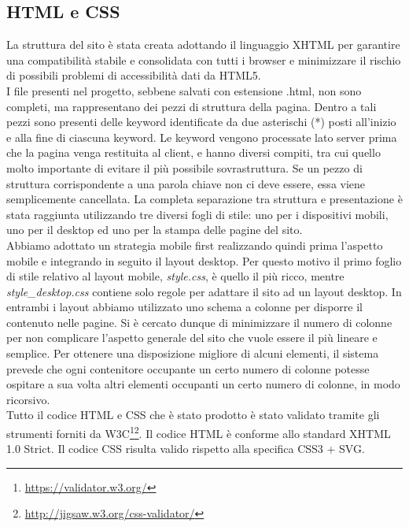 \subsection{HTML e CSS}
La struttura del sito è stata creata adottando il linguaggio XHTML per garantire una compatibilità stabile e consolidata con tutti i browser e minimizzare il rischio di possibili problemi di accessibilità dati da HTML5.\\
I file presenti nel progetto, sebbene salvati con estensione .html, non sono completi, ma rappresentano dei pezzi di struttura della pagina. Dentro a tali pezzi sono presenti delle keyword identificate da due asterischi (*) posti all'inizio e alla fine di ciascuna keyword. Le keyword vengono processate lato server prima che la pagina venga restituita al client, e hanno diversi compiti, tra cui quello molto importante di evitare il più possibile sovrastruttura. Se un pezzo di struttura corrispondente a una parola chiave non ci deve essere, essa viene semplicemente cancellata.
La completa separazione tra struttura e presentazione è stata raggiunta utilizzando tre diversi fogli di stile: uno per i dispositivi mobili, uno per il desktop ed uno per la stampa delle pagine del sito.\\
 Abbiamo adottato un strategia mobile first realizzando quindi prima l'aspetto mobile e integrando in seguito il layout desktop. Per questo motivo il primo foglio di stile relativo al layout mobile, \textit{style.css}, è quello il più ricco, mentre \textit{style\_desktop.css} contiene solo regole per adattare il sito ad un layout desktop. In entrambi i layout abbiamo utilizzato uno schema a colonne per disporre il contenuto nelle pagine. Si è cercato dunque di minimizzare il numero di colonne per non complicare l'aspetto generale del sito che vuole essere il più lineare e semplice. Per ottenere una disposizione migliore di alcuni elementi, il sistema prevede che ogni contenitore occupante un certo numero di colonne potesse ospitare a sua volta altri elementi occupanti un certo numero di colonne, in modo ricorsivo.
\\
Tutto il codice HTML e CSS che è stato prodotto è stato validato tramite gli strumenti forniti da W3C\footnote{\url{https://validator.w3.org/}}\footnote{\url{http://jigsaw.w3.org/css-validator/}}. Il codice HTML è conforme allo standard XHTML 1.0 Strict. Il codice CSS risulta valido rispetto alla specifica CSS3 + SVG.
